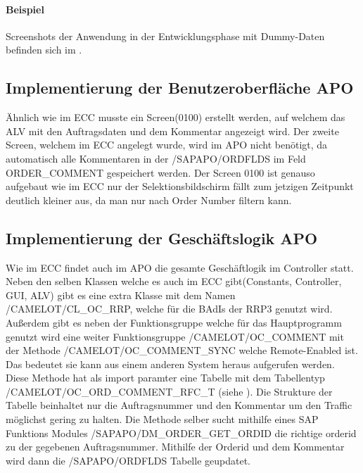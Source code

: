 \paragraph{Beispiel}
Screenshots der Anwendung in der Entwicklungsphase mit Dummy-Daten befinden sich im .

\subsection{Implementierung der Benutzeroberfläche APO}
\label{sec:Implementierung der Benutzeroberfläche APO} 
Ähnlich wie im \ac{ECC} musste ein Screen(0100) erstellt werden, auf welchem das \ac{ALV} mit den Auftragsdaten und dem Kommentar angezeigt wird. Der zweite Screen, welchem im \ac{ECC} angelegt wurde, wird im \ac{APO} nicht benötigt, da automatisch alle Kommentaren in der /SAPAPO/ORDFLDS im Feld ORDER\_COMMENT gespeichert werden. Der Screen 0100 ist genauso aufgebaut wie im \ac{ECC} nur der Selektionsbildschirm fällt zum jetzigen Zeitpunkt deutlich kleiner aus, da man nur nach Order Number filtern kann.  

\subsection{Implementierung der Geschäftslogik APO}
\label{sec:Implementierung der Geschäftslogik APO}  
Wie im ECC findet auch im APO die gesamte Geschäftlogik im Controller statt. Neben den selben Klassen welche es auch im ECC gibt(Constants, Controller, \ac{GUI}, \ac{ALV}) gibt es eine extra Klasse mit dem Namen /CAMELOT/CL\_OC\_RRP, welche für die \ac{BAdI}s der RRP3 genutzt wird. Außerdem gibt es neben der Funktionsgruppe welche für das Hauptprogramm genutzt wird eine weiter Funktionsgruppe /CAMELOT/OC\_COMMENT mit der Methode /CAMELOT/OC\_COMMENT\_SYNC welche Remote-Enabled ist. Das bedeutet sie kann aus einem anderen System heraus aufgerufen werden. Diese Methode hat als import paramter eine Tabelle mit dem Tabellentyp /CAMELOT/OC\_ORD\_COMMENT\_RFC\_T (siehe ). Die Strukture der Tabelle beinhaltet nur die Auftragsnummer und den Kommentar um den Traffic möglichst gering zu halten. Die Methode selber sucht mithilfe eines SAP Funktions Modules /SAPAPO/DM\_ORDER\_GET\_ORDID die richtige orderid zu der gegebenen Auftragsnummer. Mithilfe der Orderid und dem Kommentar wird dann die /SAPAPO/ORDFLDS Tabelle geupdatet.  

